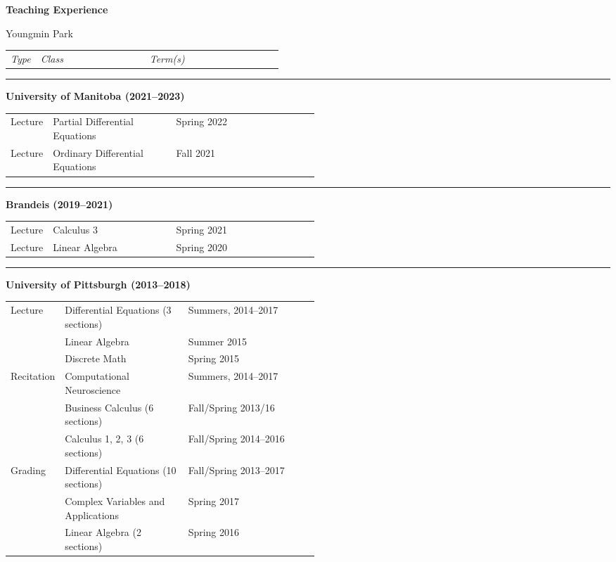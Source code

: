 \documentclass[a4paper,11pt]{article}
\begin{document}
	
	\begin{center}
		\Large \textbf{Teaching Experience}
		
		\Large Youngmin Park
	\end{center}
	
	
	\begin{tabular}{p{0.11\linewidth}p{0.4\linewidth}p{.3\linewidth}}
		\textit{Type} & \textit{Class} & \textit{Term(s)}
	\end{tabular}
	
	\noindent\rule{15cm}{0.4pt}
	
	\textbf{University of Manitoba (2021--2023)}
	
	\begin{tabular}{p{0.11\linewidth}p{0.4\linewidth}p{.3\linewidth}}
		{Lecture} & Partial Differential Equations & Spring 2022\\
		{Lecture} & Ordinary Differential Equations & Fall 2021
	\end{tabular}
	
	
	\noindent\rule{15cm}{0.4pt}
	
	\textbf{Brandeis (2019--2021)}
	
	\begin{tabular}{p{0.11\linewidth}p{0.4\linewidth}p{.3\linewidth}}
		{Lecture} & Calculus 3 & Spring 2021\\
		{Lecture} & Linear Algebra & Spring 2020
	\end{tabular}
	
	\noindent\rule{15cm}{0.4pt}
	
	\textbf{University of Pittsburgh (2013--2018)}
	
	\begin{tabular}{p{0.11\linewidth}p{0.4\linewidth}p{.3\linewidth}}
		Lecture & Differential Equations (3 sections) & Summers, 2014--2017\\
		& Linear Algebra & Summer 2015 \\
		& Discrete Math & Spring 2015 \\
		Recitation & Computational Neuroscience & Summers, 2014--2017 \\
		& Business Calculus (6 sections) & Fall/Spring 2013/16\\
		& Calculus 1, 2, 3 (6 sections) & Fall/Spring 2014--2016\\
		Grading & Differential Equations (10 sections) & Fall/Spring 2013--2017  \\
		& Complex Variables and Applications & Spring 2017 \\
		& Linear Algebra (2 sections) & Spring 2016
	\end{tabular}
	
\end{document}
